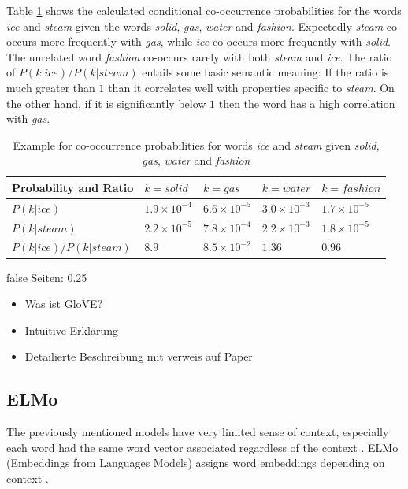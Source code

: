 \documentclass[draft,final,oneside]{vutinfth} %
\begin{document}
Table \ref{gloveprobability} shows the calculated conditional co-occurrence probabilities for the words \textit{ice} and \textit{steam} given the words \textit{solid}, \textit{gas}, \textit{water} and \textit{fashion}. Expectedly \textit{steam} co-occurs more frequently with \textit{gas}, while \textit{ice} co-occurs more frequently with \textit{solid}. The unrelated word \textit{fashion} co-occurs rarely with both \textit{steam} and \textit{ice}. The ratio of $P(k|ice) / P(k|steam)$ entails some basic semantic meaning: If the ratio is much greater than $1$ than it correlates well with properties specific to \textit{steam}. On the other hand, if it is significantly below $1$ then the word has a high correlation with \textit{gas}.

\begin{table}[]
\centering
\begin{tabular}{l|llll}
Probability and Ratio & $k=solid$ & $k=gas$ & $k=water$ & $k=fashion$ \\ \hline
$P(k|ice)$ & $1.9 \times 10^{-4}$ & $6.6 \times 10^{-5}$ & $3.0 \times 10^{-3}$ & $1.7 \times 10^{-5}$          \\
$P(k|steam)$ & $2.2 \times 10^{-5}$ & $7.8 \times 10^{-4}$ & $2.2 \times 10^{-3}$ & $1.8 \times 10^{-5}$          \\
$P(k|ice) / P(k|steam)$ & $8.9$ & $8.5 \times 10^{-2}$ & $1.36$ & $0.96$         
\end{tabular}
\caption{Example for co-occurrence probabilities for words \textit{ice} and \textit{steam} given \textit{solid}, \textit{gas}, \textit{water} and \textit{fashion} \cite{pennington2014glove}}
\label{gloveprobability}
\end{table}

\if false
Seiten: 0.25

\begin{itemize}
\item Was ist GloVE?
\item Intuitive Erklärung
\item Detailierte Beschreibung mit verweis auf Paper
\end{itemize}

\fi

\subsection{ELMo}
The previously mentioned models have very limited sense of context, especially each word had the same word vector associated regardless of the context \cite{pennington2014glove}\cite{tfidf}. ELMo (Embeddings from Languages Models) assigns word embeddings depending on context \cite{elmo}.
\end{document}
